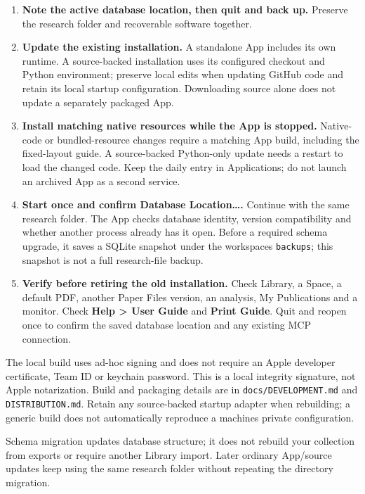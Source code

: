 \documentclass[10pt,letterpaper,oneside]{scrreprt}
\providecommand{\tightlist}{\setlength{\itemsep}{1pt}\setlength{\parskip}{0pt}}
\begin{document}
\begin{enumerate}
\tightlist
\item
  \textbf{Note the active database location, then quit and back up.} Preserve the research folder and recoverable software together.
\item
  \textbf{Update the existing installation.} A standalone App includes its own runtime. A source-backed installation uses its configured checkout and Python environment; preserve local edits when updating GitHub code and retain its local startup configuration. Downloading source alone does not update a separately packaged App.
\item
  \textbf{Install matching native resources while the App is stopped.} Native-code or bundled-resource changes require a matching App build, including the fixed-layout guide. A source-backed Python-only update needs a restart to load the changed code. Keep the daily entry in Applications; do not launch an archived App as a second service.
\item
  \textbf{Start once and confirm \textbf{Database Location\ldots{}}.} Continue with the same research folder. The App checks database identity, version compatibility and whether another process already has it open. Before a required schema upgrade, it saves a SQLite snapshot under the workspace\textquotesingle s \texttt{backups}; this snapshot is not a full research-file backup.
\item
  \textbf{Verify before retiring the old installation.} Check Library, a Space, a default PDF, another Paper Files version, an analysis, My Publications and a monitor. Check \textbf{Help \textgreater{} User Guide} and \textbf{Print Guide}. Quit and reopen once to confirm the saved database location and any existing MCP connection.
\end{enumerate}

The local build uses ad-hoc signing and does not require an Apple developer certificate, Team ID or keychain password. This is a local integrity signature, not Apple notarization. Build and packaging details are in \texttt{docs/DEVELOPMENT.md} and \texttt{DISTRIBUTION.md}. Retain any source-backed startup adapter when rebuilding; a generic build does not automatically reproduce a machine\textquotesingle s private configuration.

Schema migration updates database structure; it does not rebuild your collection from exports or require another Library import. Later ordinary App/source updates keep using the same research folder without repeating the directory migration.
\end{document}
